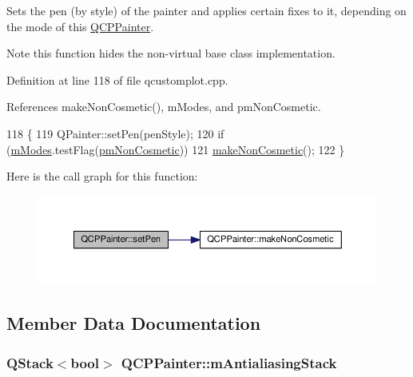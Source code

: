 Sets the pen (by style) of the painter and applies certain fixes to it, depending on the mode of this \hyperlink{class_q_c_p_painter}{Q\+C\+P\+Painter}.

\begin{DoxyNote}{Note}
this function hides the non-\/virtual base class implementation. 
\end{DoxyNote}


Definition at line 118 of file qcustomplot.\+cpp.



References make\+Non\+Cosmetic(), m\+Modes, and pm\+Non\+Cosmetic.


\begin{DoxyCode}
118                                            \{
119   QPainter::setPen(penStyle);
120   \textcolor{keywordflow}{if} (\hyperlink{class_q_c_p_painter_af5d1d6e5df0adbc7de5633250fb3396c}{mModes}.testFlag(\hyperlink{class_q_c_p_painter_a156cf16444ff5e0d81a73c615fdb156dac1e481bfaf408f2bd2eaad3ec341f36b}{pmNonCosmetic}))
121     \hyperlink{class_q_c_p_painter_a7e63fbcf47e35c6f2ecd11b8fef7c7d8}{makeNonCosmetic}();
122 \}
\end{DoxyCode}


Here is the call graph for this function\+:\nopagebreak
\begin{figure}[H]
\begin{center}
\leavevmode
\includegraphics[width=350pt]{class_q_c_p_painter_a25e76095aae41da0d08035060e5f81ca_cgraph}
\end{center}
\end{figure}




\subsection{Member Data Documentation}
\hypertarget{class_q_c_p_painter_a0189e641bbf7dc31ac15aef7b36501fa}{}
\subsubsection[{m\+Antialiasing\+Stack}]{\setlength{\rightskip}{0pt plus 5cm}Q\+Stack$<$bool$>$ Q\+C\+P\+Painter\+::m\+Antialiasing\+Stack\hspace{0.3cm}{\ttfamily [protected]}}\label{class_q_c_p_painter_a0189e641bbf7dc31ac15aef7b36501fa}


